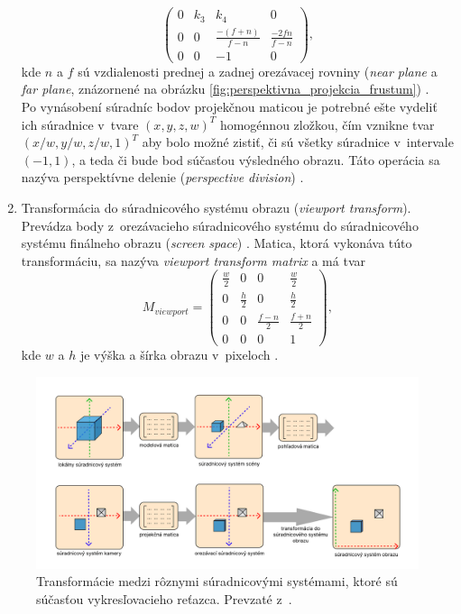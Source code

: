 \begin{enumerate}
$$\begin{pmatrix}
    0 & k_3 & k_4 & 0 \\
    0 & 0 & \frac{-(f+n)}{f-n} & \frac{-2fn}{f-n} \\
    0 & 0 & -1 & 0
    \end{pmatrix}
    \mathrm{,}
    $$
    kde $n$ a $f$ sú vzdialenosti prednej a zadnej orezávacej rovniny (\emph{near plane} a \emph{far plane}, znázornené na obrázku \ref{fig:perspektivna_projekcia_frustum}) \cite{ahn_projection_matrix}. \\ 
    Po vynásobení súradníc bodov projekčnou maticou je potrebné ešte vydeliť ich súradnice v~tvare $(x, y, z, w)^T$ homogénnou zložkou, čím vznikne tvar $(x/w, y/w, z/w, 1)^T$ aby bolo možné zistiť, či sú všetky súradnice v~intervale $(-1, 1)$, a teda či bude bod súčasťou výsledného obrazu. Táto operácia sa nazýva perspektívne delenie (\emph{perspective division}) \cite{de_vries_coordinate_systems}.  
    \item Transformácia do súradnicového systému obrazu (\emph{viewport transform}). Prevádza body z~orezávacieho súradnicového systému do súradnicového systému finálneho obrazu (\emph{\mbox{screen} space}) \cite{de_vries_coordinate_systems}. Matica, ktorá vykonáva túto transformáciu, sa nazýva \emph{viewport transform matrix} a má tvar
    $$
    M_{viewport} = 
    \begin{pmatrix}
    \frac{w}{2} & 0 & 0 & \frac{w}{2} \\
    0 & \frac{h}{2} & 0 & \frac{h}{2} \\
    0 & 0 & \frac{f-n}{2} & \frac{f+n}{2} \\
    0 & 0 & 0 & 1
    \end{pmatrix}
    \mathrm{,}
    $$
    kde $w$ a $h$ je výška a šírka obrazu v~pixeloch \cite{ahn_viewport_transform}.
\end{enumerate}

\begin{figure}[t]
    \centering
    \includegraphics[width=1\linewidth]{text_prace/obrazky-figures/suradnicove_systemy.pdf}
    \caption[Transformácie medzi rôznymi súradnicovými systémami, ktoré sú súčasťou vykresľovacieho reťazca.]{Transformácie medzi rôznymi súradnicovými systémami, ktoré sú súčasťou vykresľovacieho reťazca. Prevzaté z~\cite{de_vries_coordinate_systems}.}
    \label{fig:suradnicove_systemy}
\end{figure}

